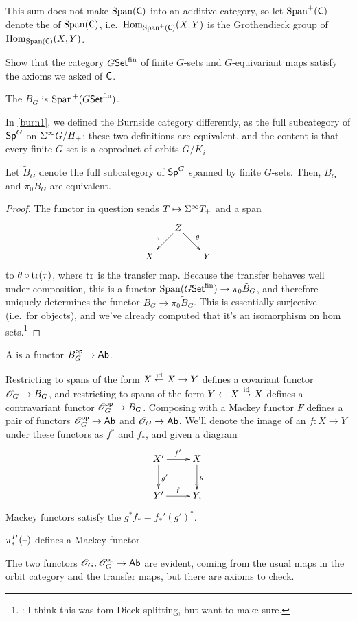 This sum does not make $\operatorname{Span}(\mathsf C)$ into an additive category, so let $\operatorname{Span}^+(\mathsf C)$ denote the  of $\operatorname{Span}(\mathsf C)$, i.e.\ $\operatorname{Hom}_{\operatorname{Span}^+(\mathsf C)}(X,Y)$ is the Grothendieck group of
$\operatorname{Hom}_{\operatorname{Span}(\mathsf C)}(X,Y)$.
\begin{ex}
Show that the category $G\mathsf{Set}^{\mathrm{fin}}$ of finite $G$-sets and $G$-equivariant maps satisfy the axioms we
asked of $\mathsf C$.
\end{ex}
\begin{defn}
The  $B_G$ is $\operatorname{Span}^+(G\mathsf{Set}^{\mathrm{fin}})$.
\end{defn}
In \cref{burn1}, we defined the Burnside category differently, as the full subcategory of $\mathsf{Sp}^G$ on $\Sigma^\infty G/H_+$;
these two definitions are equivalent, and the content is that every finite $G$-set is a coproduct of orbits
$G/K_i$.
\begin{prop}
Let $\tilde B_G$ denote the full subcategory of $\mathsf{Sp}^G$ spanned by finite $G$-sets. Then, $B_G$ and $\pi_0\tilde
B_G$ are equivalent.
\end{prop}
\begin{proof}
The functor in question sends $T\mapsto\sus T_+$ and a span
\[\xymatrix@dr{
	Z\ar[r]^\theta\ar[d]_\tau & Y\\
	X
}\]
to $\theta\circ\operatorname{tr}(\tau)$, where $\operatorname{tr}$ is the transfer map. Because the transfer behaves well under composition,
this is a functor $\operatorname{Span}(G\mathsf{Set}^{\mathrm{fin}})\to\pi_0\tilde B_G$, and therefore uniquely determines the functor
$B_G\to\pi_0\tilde B_G$. This is essentially surjective (i.e.\ for objects), and we've already computed that it's
an isomorphism on hom sets.\footnote{\TODO: I think this was tom Dieck splitting, but want to make sure.}
\end{proof}
\begin{defn}
A  is a functor $B_G^{\mathsf{op}}\to\mathsf{Ab}$.
\end{defn}
Restricting to spans of the form $X\stackrel{\mathrm{id}}\gets X\to Y$ defines a covariant functor
$\mathscr O_G\to B_G$, and restricting to spans of the form $Y\gets X\stackrel{\mathrm{id}}\to X$ defines a contravariant functor
$\mathscr O_G^{\mathsf{op}}\to B_G$. Composing with a Mackey functor $F$ defines a pair of functors $\mathscr O_G^{\mathsf{op}}\to\mathsf{Ab}$ and
$\mathscr O_G\to\mathsf{Ab}$. We'll denote the image of an $f\colon X\to Y$ under these functors as $f^*$ and $f_*$, and given a
diagram
\[\xymatrix{
	X'\ar[r]^{f'}\ar[d]^{g'} & X\ar[d]^g\\
	Y'\ar[r]^f & Y,
}\]
Mackey functors satisfy the  $g^*f_* = f_*'(g')^*$.
\begin{prop}
$\pi_*^H(\text{--})$ defines a Mackey functor.
\end{prop}
The two functors $\mathscr O_G,\mathscr O_G^{\mathsf{op}}\to\mathsf{Ab}$ are evident, coming from the usual maps in the orbit category and the
transfer maps, but there are axioms to check.

